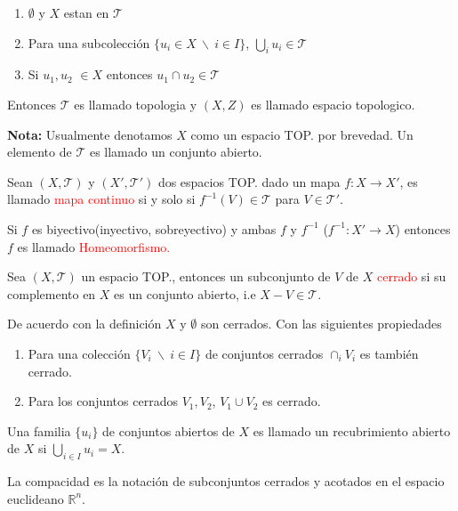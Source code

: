 \documentclass[../main]{subfiles}
\begin{document}
\begin{adjustwidth}{0pt}{-100pt}
\begin{enumerate}
    \item $\emptyset$ y $X$ estan en $\mathcal{T}$
    \item Para una subcolección $\{ u_i \in X \ \backslash \ i \in I\}$, $\bigcup_i u_i \in \mathcal{T}$
    \item Si $u_1, u_2$ $\in X$ entonces $u_1 \cap u_2 \in \mathcal{T}$
\end{enumerate}

Entonces $\mathcal{T}$ es llamado topologia y $(X, Z)$ es llamado espacio topologico.

\textbf{Nota:} Usualmente denotamos $X$ como un espacio TOP. por brevedad. Un elemento de $\mathcal{T}$ es llamado un conjunto abierto.

Sean $(X, \mathcal{T})$ y $(X', \mathcal{T}')$ dos espacios TOP. dado un mapa $f:X\rightarrow X'$, es llamado \textcolor{red}{mapa continuo} si y solo si $f^{-1}(V)\in \mathcal{T}$ para $V \in \mathcal{T}'$.

Si $f$ es biyectivo(inyectivo, sobreyectivo) y ambas $f$ y $f^{-1}$ ($f^{-1}: X'\rightarrow X$) entonces $f$ es llamado \textcolor{red}{Homeomorfismo.}

Sea $(X, \mathcal{T})$ un espacio TOP., entonces un subconjunto de $V$ de $X$ \textcolor{red}{cerrado} si su complemento en $X$ es un conjunto abierto, i.e $X-V \in \mathcal{T}$.

De acuerdo con la definición $X$ y $\emptyset$ son cerrados. Con las siguientes propiedades
\begin{enumerate}[label=(\alph*)]
    \item Para una colección $\{ V_i \ \backslash \ i \in I\}$ de conjuntos cerrados $\cap_i V_i$ es también cerrado.
    \item Para los conjuntos cerrados $V_1, V_2$, $V_1 \cup V_2$ es cerrado.
\end{enumerate}
Una familia $\{ u_i\}$ de conjuntos abiertos de $X$ es llamado un recubrimiento abierto de $X$ si $\bigcup_{i\in I}u_i=X$.


La compacidad es la notación de subconjuntos cerrados y acotados en el espacio euclideano $\mathbb{R}^n$.


\end{adjustwidth}
\end{document}
